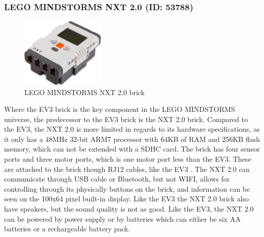 \subsubsection{LEGO MINDSTORMS NXT 2.0 (ID: 53788)}
\begin{figure}[H]
  \centering
  \includegraphics[width=4cm]{images/techAnalysis/LegoNXT2.jpg}
  \caption{LEGO MINDSTORMS NXT 2.0 brick \cite{BrickOWl-figure-NXT2}}\label{fig:sssec:LEGONXT2-NXT2}
\end{figure}
Where the EV3 brick is the key component in the LEGO MINDSTORMS universe, the predecessor to the EV3 brick is the NXT 2.0 brick.
Compared to the EV3, the NXT 2.0 is more limited in regards to its hardware specifications, as it only has a 48MHz 32-bit ARM7 processor with 64KB of RAM and 256KB flash memory, which can not be extended with a SDHC card.
The brick has four sensor ports and three motor ports, which is one motor port less than the EV3.
These are attached to the brick though RJ12 cables, like the EV3 \cite{LEGO_ev3_nodate}.
The NXT 2.0 can communicate through USB cable or Bluetooth, but not WIFI, allows for controlling through its physically buttons on the brick, and information can be seen on the 100x64 pixel built-in display.
Like the EV3 the NXT 2.0 brick also have speakers, but the sound quality is not as good.
Like the EV3, the NXT 2.0 can be powered by power supply or by batteries which can either be six AA batteries or a rechargeable battery pack.
\cite{montes_real-time_2019, lego_mindstorms_2009}

